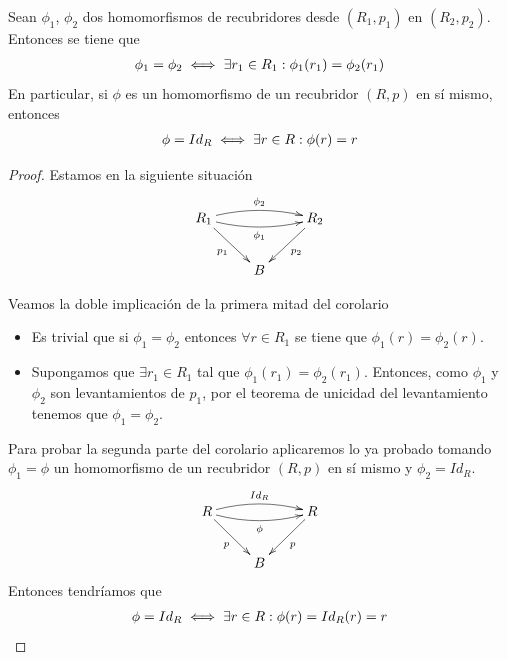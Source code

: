 \begin{coro}\label{coro-2.3.1}
    Sean $\phi_1$, $\phi_2$ dos homomorfismos de recubridores desde $(R_1,p_1)$ en $(R_2,p_2)$. Entonces se tiene que 
    \begin{gather*}
        \phi_1 = \phi_2 \iff \exists r_1\in R_1 : \phi_1(r_1) = \phi_2(r_1)
    \end{gather*}
    En particular, si $\phi$ es un homomorfismo de un recubridor $(R,p)$ en sí mismo, entonces
    \begin{gather*}
        \phi = Id_{R} \iff \exists r \in R : \phi(r)=r
    \end{gather*}

    \begin{proof}
        Estamos en la siguiente situación
        \begin{gather*}
            \xymatrix{
                R_1 \ar@/^/[rr]^{\phi_2} \ar@/_/[rr]_{\phi_1} \ar[dr]_{p_1} && R_2 \ar[dl]^{p_2} \\
                & B
            }
        \end{gather*}

        Veamos la doble implicación de la primera mitad del corolario
        \begin{itemize}
            \item[$\Rightarrow$)] Es trivial que si $\phi_1=\phi_2$ entonces $\forall r \in R_1$ se tiene que $\phi_1(r)=\phi_2(r)$.
            \item[$\Leftarrow$)] Supongamos que $\exists r_1\in R_1$ tal que $\phi_1(r_1)=\phi_2(r_1)$. Entonces, como $\phi_1$ y $\phi_2$ son levantamientos de $p_1$, por el teorema de unicidad del levantamiento tenemos que $\phi_1=\phi_2$.
        \end{itemize}

        Para probar la segunda parte del corolario aplicaremos lo ya probado tomando $\phi_1=\phi$ un homomorfismo de un recubridor $(R,p)$ en sí mismo y $\phi_2=Id_R$.
        \begin{gather*}
            \xymatrix{
                R \ar@/^/[rr]^{Id_R} \ar@/_/[rr]_{\phi} \ar[dr]_{p} && R \ar[dl]^{p} \\
                & B
            }
        \end{gather*}
        Entonces tendríamos que 
        \begin{gather*}
            \phi = Id_R \iff \exists r\in R : \phi(r)=Id_R(r)=r
        \end{gather*}
    \end{proof}
\end{coro}

